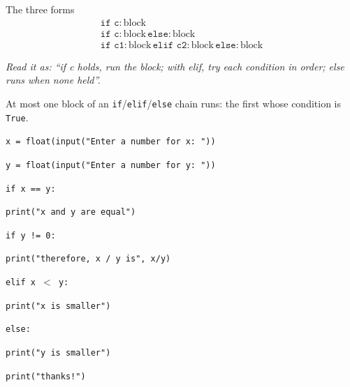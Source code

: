 \documentclass[11pt]{article}
\begin{document}
\begin{keepsection}
\begin{equationcard}{The three forms}
\[ \begin{gathered} \texttt{if c:}\, \text{block} \\ \texttt{if c:}\, \text{block}\, \texttt{else:}\, \text{block} \\ \texttt{if c1:}\, \text{block}\, \texttt{elif c2:}\, \text{block}\, \texttt{else:}\, \text{block} \end{gathered} \]
{\small \emph{Read it as: “if c holds, run the block; with elif, try each condition in order; else runs when none held”.}\par  At most one block of an \texttt{if}/\texttt{elif}/\texttt{else} chain runs: the first whose condition is \texttt{True}.}
\end{equationcard}
\begin{tcolorbox}[colback=Paperblue,colframe=Paperblue,boxrule=0pt,arc=0pt,left=7pt,right=7pt,top=5pt,bottom=5pt]\small\sloppy
\noindent\hspace*{0em}\texttt{x = float(input("Enter a number for x: "))}\par
\noindent\hspace*{0em}\texttt{y = float(input("Enter a number for y: "))}\par
\noindent\hspace*{0em}\texttt{if x == y:}\par
\noindent\hspace*{1em}\texttt{print("x and y are equal")}\par
\noindent\hspace*{1em}\texttt{if y != 0:}\par
\noindent\hspace*{3em}\texttt{print("therefore, x / y is", x/y)}\par
\noindent\hspace*{0em}\texttt{elif x \ensuremath{<} y:}\par
\noindent\hspace*{1em}\texttt{print("x is smaller")}\par
\noindent\hspace*{0em}\texttt{else:}\par
\noindent\hspace*{1em}\texttt{print("y is smaller")}\par
\noindent\hspace*{0em}\texttt{print("thanks!")}\par
\end{tcolorbox}


\end{keepsection}
\end{document}
